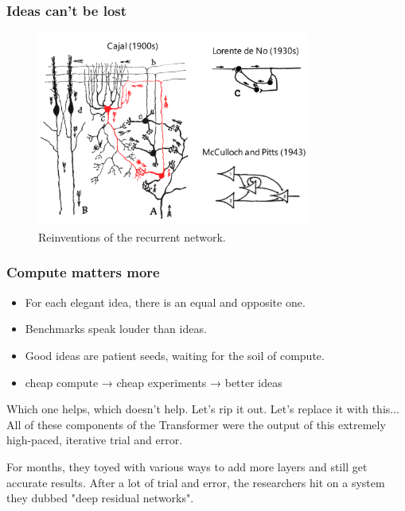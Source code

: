 \documentclass{beamer}
\begin{document}
\begin{frame}
    \frametitle{Ideas can't be lost}

    \begin{figure}[t]
        \includegraphics[width=0.8\textwidth]{figure/RNN_history.png}
        \centering
        \caption{Reinventions of the recurrent network.}
    \end{figure}
\end{frame}


\begin{frame}
    \frametitle{Compute matters more}
    \begin{itemize}
        \item For each elegant idea, there is an equal and opposite one.
        \item Benchmarks speak louder than ideas.
        \item Good ideas are patient seeds, waiting for the soil of compute. 
        \item cheap compute → cheap experiments → better ideas
    \end{itemize}
    \begin{displayquote}
        Which one helps, which doesn't help. Let's rip it out. Let's replace it with this... All of these components of the Transformer were the output of this extremely high-paced, iterative trial and error.  \cite{levyGoogleEmployeesInvented2024}
    \end{displayquote}
    \begin{displayquote}
        For months, they toyed with various ways to add more layers and still get accurate results. After a lot of trial and error, the researchers hit on a system they dubbed "deep residual networks". \cite{linnMicrosoftResearchersWin2015}
        \end{displayquote}
\end{frame}
\end{document}
